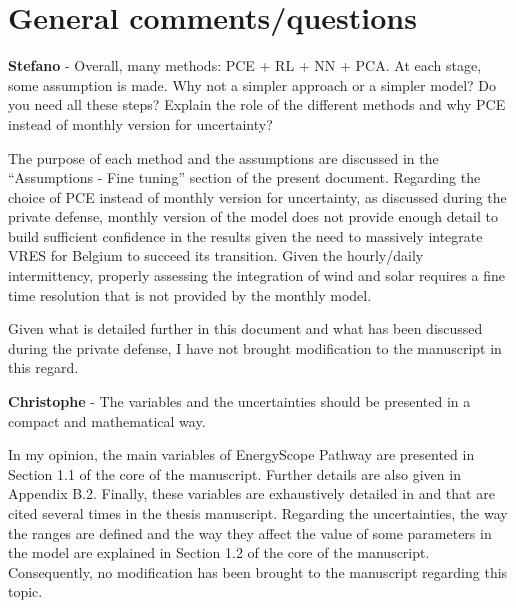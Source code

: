 \documentclass[12pt,a4paper]{article}
\newcommand{\clearemptydoublepage}{\newpage{\pagestyle{empty}\cleardoublepage}} %
\begin{document}
\clearemptydoublepage

\section{General comments/questions}
\label{General}

\begin{mdframed}[style=comment] %
{\color{orange} \textbf{Stefano}} - Overall, many methods: PCE + RL + NN + PCA. At each stage, some assumption is made. Why not a simpler approach or a simpler model? Do you need all these steps? Explain the role of the different methods and why PCE instead of monthly version for uncertainty? 
\end{mdframed}

\noindent The purpose of each method and the assumptions are discussed in the ``Assumptions - Fine tuning'' section of the present document. Regarding the choice of PCE instead of monthly version for uncertainty, as discussed during the private defense, monthly version of the model does not provide enough detail to build sufficient confidence in the results given the need to massively integrate VRES for Belgium to succeed its transition. Given the hourly/daily intermittency, properly assessing the integration of wind and solar requires a fine time resolution that is not provided by the monthly model. 

Given what is detailed further in this document and what has been discussed during the private defense, I have not brought modification to the manuscript in this regard.

\begin{mdframed}[style=comment] %
{\color{violet} \textbf{Christophe}} - The variables and the uncertainties should be presented in a compact and mathematical way.
\end{mdframed}

\noindent In my opinion, the main variables of EnergyScope Pathway are presented {\color{blue} in Section 1.1 of the core of the manuscript}. Further details are also given {\color{blue}in Appendix B.2}. Finally, these variables are exhaustively detailed in \cite{limpens2019energyscope} and \cite{limpens2024pathway} that are cited several times in the thesis manuscript.  Regarding the uncertainties, the way the ranges are defined and the way they affect the value of some parameters in the model are explained {\color{blue}in Section 1.2 of the core of the manuscript}. Consequently, no modification has been brought to the manuscript regarding this topic.
\end{document}
